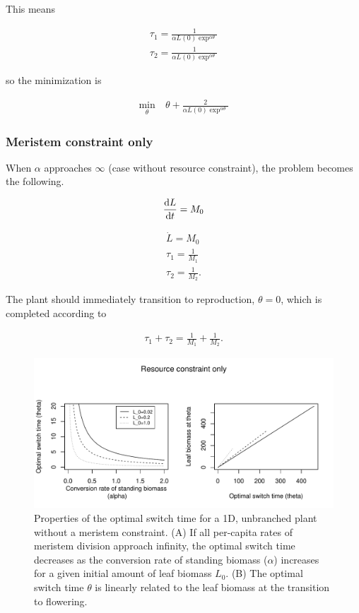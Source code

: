 \documentclass[12pt, oneside]{article}   	%
\begin{document}
This means

\begin{align}
\tau_1 = \frac{1}{\alpha L(0) \exp^{\alpha \theta}} \nonumber \\ 
\tau_2 = \frac{1}{\alpha L(0) \exp^{\alpha \theta}} \nonumber
\end{align}

so the minimization is 

\begin{align}
\min_{\theta} & \ \theta + \frac{2}{\alpha L(0) \exp^{\alpha \theta}}  \nonumber
\end{align}

\clearpage
\newpage

\subsubsection{Meristem constraint only}
When $\alpha$ approaches $\infty$ (case without resource constraint), the problem becomes the following. 

\begin{align}
\dv{L}{t} = M_0
\end{align}

\begin{align}
\dot{L} =  M_0 \nonumber \\
\tau_1 = \frac{1}{M_1} \nonumber \\ 
\tau_2 = \frac{1}{M_2}. \nonumber
\end{align}

The plant should immediately transition to reproduction, $\theta=0$, which is completed according to

\begin{align}
\tau_1 + \tau_2 = \frac{1}{M_1} + \frac{1}{M_2}.  \nonumber
\end{align}

\clearpage
\newpage

\begin{figure}[!h]
       \includegraphics[width=\textwidth]{../../figures/1d-resource-only.pdf}  
    \caption{ Properties of the optimal switch time for a 1D, unbranched plant without a meristem constraint. (A) If all per-capita rates of meristem division approach infinity, the optimal switch time decreases as the conversion rate of standing biomass ($\alpha$) increases  for a given initial amount of leaf biomass $L_0$. (B) The optimal switch time $\theta$ is linearly related to the leaf biomass at the transition to flowering.   }
 \label{fig:figure-x}
\end{figure}
\end{document}
